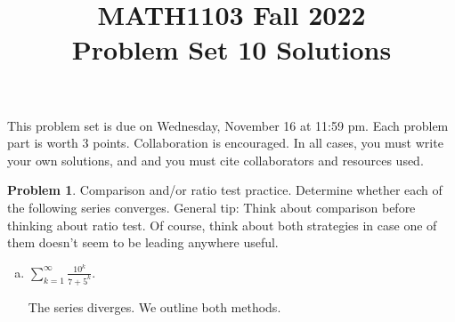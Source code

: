 \documentclass[11pt,oneside]{amsart}
\title{MATH1103 Fall 2022\\
Problem Set 10 Solutions}
\theoremstyle{definition}
\newtheorem{problem}{Problem}
\theoremstyle{plain}
\begin{document}
\maketitle
This problem set is due on Wednesday, November 16 at 11:59 pm. Each problem part is worth 3 points. Collaboration is encouraged. In all cases, you must write your own solutions, and and you must cite collaborators and resources used.

\begin{problem}
Comparison and/or ratio test practice. Determine whether each of the following series converges. General tip: Think about comparison before thinking about ratio test. Of course, think about both strategies in case one of them doesn't seem to be leading anywhere useful.
\begin{enumerate}[(a)]
  \item $\displaystyle\sum_{k=1}^\infty{\frac{10^k}{7+5^k}}$.
        \begin{solution}
          The series diverges. We outline both methods.


\end{solution}
\end{enumerate}
\end{problem}
\end{document}
